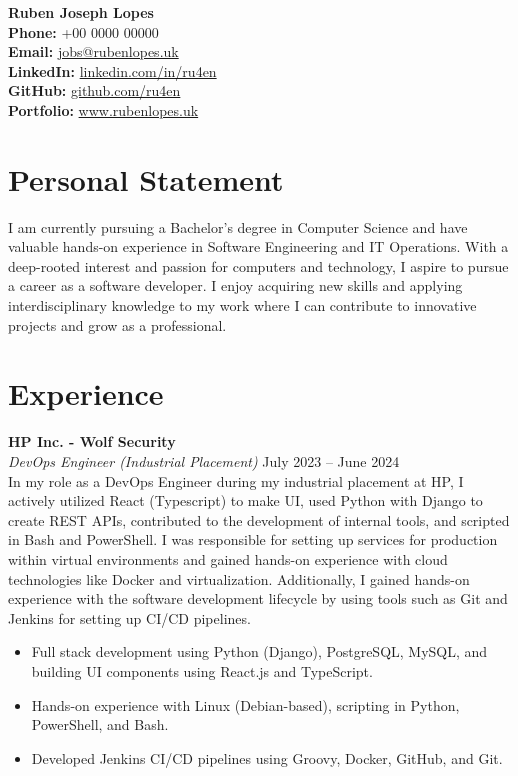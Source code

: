 \documentclass[a4paper,12pt]{article}
\begin{document}
\noindent
\textbf{Ruben Joseph Lopes} \\
\textbf{Phone:} +00 0000 00000 \\
\textbf{Email:} \href{mailto:jobs@rubenlopes.uk}{jobs@rubenlopes.uk} \\
\textbf{LinkedIn:} \href{https://linkedin.com/in/ru4en}{linkedin.com/in/ru4en} \\
\textbf{GitHub:} \href{https://github.com/ru4en}{github.com/ru4en} \\
\textbf{Portfolio:} \href{http://www.rubenlopes.uk}{www.rubenlopes.uk} \\

\vspace{0.3cm} %


\section*{Personal Statement}
I am currently pursuing a Bachelor's degree in Computer Science and have valuable hands-on experience in Software Engineering and IT Operations. With a deep-rooted interest and passion for computers and technology, I aspire to pursue a career as a software developer. I enjoy acquiring new skills and applying interdisciplinary knowledge to my work where I can contribute to innovative projects and grow as a professional.

\vspace{0.5cm}

\section*{Experience}

\textbf{HP Inc. - Wolf Security} \\
\textit{DevOps Engineer (Industrial Placement)} \hfill July 2023 – June 2024 \\
In my role as a DevOps Engineer during my industrial placement at HP, I actively utilized React (Typescript) to make UI, used Python with Django to create REST APIs, contributed to the development of internal tools, and scripted in Bash and PowerShell. I was responsible for setting up services for production within virtual environments and gained hands-on experience with cloud technologies like Docker and virtualization. Additionally, I gained hands-on experience with the software development lifecycle by using tools such as Git and Jenkins for setting up CI/CD pipelines.

\begin{itemize}[left=0pt,labelsep=5pt]
    \item Full stack development using Python (Django), PostgreSQL, MySQL, and building UI components using React.js and TypeScript.
    \item Hands-on experience with Linux (Debian-based), scripting in Python, PowerShell, and Bash.
    \item Developed Jenkins CI/CD pipelines using Groovy, Docker, GitHub, and Git.
\end{itemize}
\end{document}
